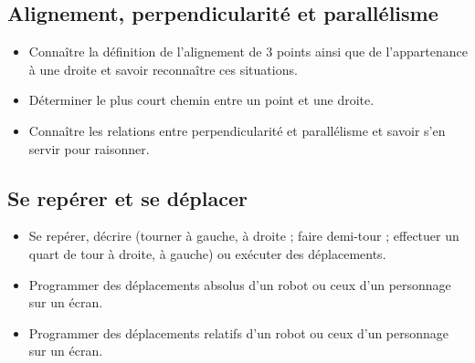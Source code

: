 \documentclass[a4paper,12pt,fleqn]{article}		
\begin{document}
\subsection*{Alignement, perpendicularité et parallélisme}

\begin{itemize}
	\item {}Connaître la définition de l’alignement de 3 points ainsi que de l’appartenance à une droite et savoir reconnaître ces situations.
	\item {}Déterminer le plus court chemin entre un point et une droite. %
	\item {}Connaître les relations entre perpendicularité et parallélisme et savoir s’en servir pour raisonner.
\end{itemize}

\subsection*{Se repérer et se déplacer}

\begin{itemize}
	\item {}Se repérer, décrire (tourner à gauche, à droite ; faire demi-tour ; effectuer un quart de tour à droite, à gauche) ou exécuter des déplacements.
	\item {}Programmer des déplacements absolus d’un robot ou ceux d’un personnage sur un écran. %
	\item {}Programmer des déplacements relatifs d’un robot ou ceux d’un personnage sur un écran. %
\end{itemize}
\end{document}
